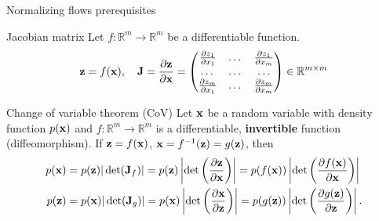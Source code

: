 \begin{frame}{Normalizing flows prerequisites}
	\begin{block}{Jacobian matrix}
		Let $f: \mathbb{R}^m \rightarrow \mathbb{R}^m$ be a differentiable function.
		\[
			\mathbf{z} = f(\mathbf{x}), \quad 
			\mathbf{J} =  \frac{\partial \mathbf{z}}{\partial \mathbf{x}} =
			\begin{pmatrix}
				\frac{\partial z_1}{\partial x_1} & \dots & \frac{\partial z_1}{\partial x_m} \\
				\dots & \dots & \dots \\ 
				\frac{\partial z_m}{\partial x_1} & \dots & \frac{\partial z_m}{\partial x_m}
			\end{pmatrix} \in \mathbb{R}^{m \times m}
		\]
		\vspace{-0.3cm}
	\end{block}
	\begin{block}{Change of variable theorem (CoV)}
		Let $\mathbf{x}$ be a random variable with density function $p(\mathbf{x})$ and $f: \mathbb{R}^m \rightarrow \mathbb{R}^m$ is a differentiable, \textbf{invertible} function (diffeomorphism). If $\mathbf{z} = f(\mathbf{x})$, $\mathbf{x} = f^{-1}(\mathbf{z}) = g(\mathbf{z})$, then
		\begin{align*}
			p(\mathbf{x}) &= p(\mathbf{z}) |\det(\mathbf{J}_f)| = p(\mathbf{z}) \left|\det \left(  \frac{\partial \mathbf{z}}{\partial \mathbf{x}} \right) \right| = p(f(\mathbf{x})) \left|\det \left(  \frac{\partial f(\mathbf{x})}{\partial \mathbf{x}} \right) \right| \\
			p(\mathbf{z}) &= p(\mathbf{x}) |\det(\mathbf{J}_g)|= p(\mathbf{x}) \left|\det \left(  \frac{\partial \mathbf{x}}{\partial \mathbf{z}} \right) \right| = p(g(\mathbf{z})) \left|\det \left(  \frac{\partial g(\mathbf{z})}{\partial \mathbf{z}} \right) \right|.
		\end{align*}
		\vspace{-0.5cm}
	\end{block}
\end{frame}

